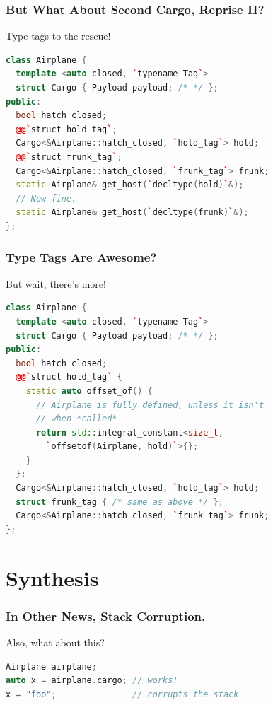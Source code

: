 \documentclass{beamer}
\begin{document}
\begin{frame}[fragile]
\frametitle{But What About Second Cargo, Reprise II?}
\begin{center}
  Type tags to the rescue!
\end{center}
\begin{lstlisting}[language=cpp]
class Airplane {
  template <auto closed, `typename Tag`>
  struct Cargo { Payload payload; /* */ };
public:
  bool hatch_closed;
  @@`struct hold_tag`;
  Cargo<&Airplane::hatch_closed, `hold_tag`> hold;
  @@`struct frunk_tag`;
  Cargo<&Airplane::hatch_closed, `frunk_tag`> frunk;
  static Airplane& get_host(`decltype(hold)`&);
  // Now fine.
  static Airplane& get_host(`decltype(frunk)`&);
};
\end{lstlisting}
\end{frame}


\begin{frame}[fragile]
\frametitle{Type Tags Are Awesome?}
\begin{center}
  But wait, there's more!
\end{center}
\begin{lstlisting}[language=cpp]
class Airplane {
  template <auto closed, `typename Tag`>
  struct Cargo { Payload payload; /* */ };
public:
  bool hatch_closed;
  @@`struct hold_tag` {
    static auto offset_of() {
      // Airplane is fully defined, unless it isn't
      // when *called*
      return std::integral_constant<size_t,
        `offsetof(Airplane, hold)`>{};
    }
  };
  Cargo<&Airplane::hatch_closed, `hold_tag`> hold;
  struct frunk_tag { /* same as above */ };
  Cargo<&Airplane::hatch_closed, `frunk_tag`> frunk;
};
\end{lstlisting}
\end{frame}


\section{Synthesis}

\begin{frame}[fragile]
\frametitle{In Other News, Stack Corruption.}
\begin{center}
  Also, what about this?
\end{center}

\begin{lstlisting}[language=cpp]
Airplane airplane;
auto x = airplane.cargo; // works!
x = "foo";               // corrupts the stack
\end{lstlisting}
\end{frame}
\end{document}
